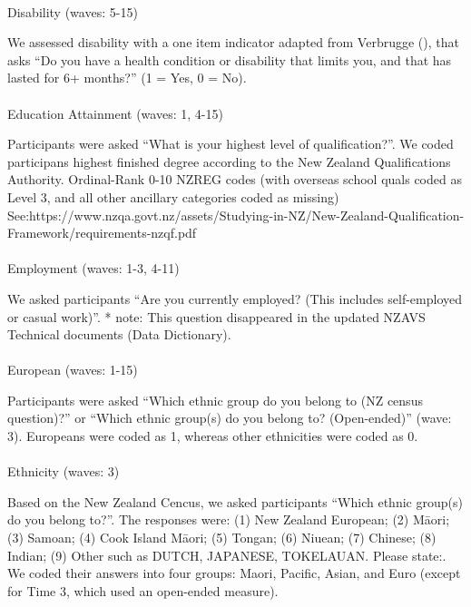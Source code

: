 \documentclass[
  singlecolumn,
  9pt]{article}
\makeatletter
\let\oldparagraph\paragraph
\renewcommand{\paragraph}{
    \@ifstar
      \xxxParagraphStar
      \xxxParagraphNoStar
  }
\newcommand{\xxxParagraphStar}[1]{\oldparagraph*{#1}\mbox{}}
\newcommand{\xxxParagraphNoStar}[1]{\oldparagraph{#1}\mbox{}}
\makeatother
\begin{document}
\paragraph{Disability (waves: 5-15)}\label{disability-waves-5-15}

We assessed disability with a one item indicator adapted from Verbrugge
(), that asks ``Do you have a health
condition or disability that limits you, and that has lasted for 6+
months?'' (1 = Yes, 0 = No).

\paragraph{Education Attainment (waves: 1,
4-15)}\label{education-attainment-waves-1-4-15}

Participants were asked ``What is your highest level of
qualification?''. We coded participans highest finished degree according
to the New Zealand Qualifications Authority. Ordinal-Rank 0-10 NZREG
codes (with overseas school quals coded as Level 3, and all other
ancillary categories coded as missing)
See:https://www.nzqa.govt.nz/assets/Studying-in-NZ/New-Zealand-Qualification-Framework/requirements-nzqf.pdf

\paragraph{Employment (waves: 1-3,
4-11)}\label{employment-waves-1-3-4-11}

We asked participants ``Are you currently employed? (This includes
self-employed or casual work)''. * note: This question disappeared in
the updated NZAVS Technical documents (Data Dictionary).

\paragraph{European (waves: 1-15)}\label{european-waves-1-15}

Participants were asked ``Which ethnic group do you belong to (NZ census
question)?'' or ``Which ethnic group(s) do you belong to? (Open-ended)''
(wave: 3). Europeans were coded as 1, whereas other ethnicities were
coded as 0.

\paragraph{Ethnicity (waves: 3)}\label{ethnicity-waves-3}

Based on the New Zealand Cencus, we asked participants ``Which ethnic
group(s) do you belong to?''. The responses were: (1) New Zealand
European; (2) Māori; (3) Samoan; (4) Cook Island Māori; (5) Tongan; (6)
Niuean; (7) Chinese; (8) Indian; (9) Other such as DUTCH, JAPANESE,
TOKELAUAN. Please state:. We coded their answers into four groups:
Maori, Pacific, Asian, and Euro (except for Time 3, which used an
open-ended measure).
\end{document}
